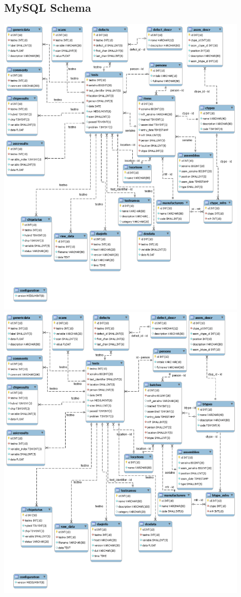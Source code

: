 \begin{appendices}
	\chapter{MySQL Schema}
	\label{app:mysqlSchema}
	\includegraphics[width=0.9\textwidth]{img/mysql_schema_items.png}\\	
	\includegraphics[width=0.9\textwidth]{img/mysql_schema_batches.png}\\

\end{appendices}
